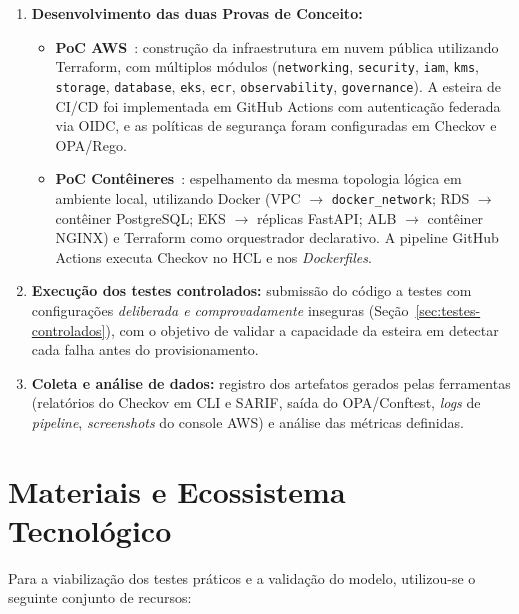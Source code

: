 \begin{enumerate}
    \item \textbf{Desenvolvimento das duas Provas de Conceito:}
    \begin{itemize}
        \item \textbf{PoC AWS}~: construção da infraestrutura em nuvem pública utilizando Terraform, com múltiplos módulos (\texttt{networking}, \texttt{security}, \texttt{iam}, \texttt{kms}, \texttt{storage}, \texttt{database}, \texttt{eks}, \texttt{ecr}, \texttt{observability}, \texttt{governance}). A esteira de CI/CD foi implementada em GitHub Actions com autenticação federada via OIDC, e as políticas de segurança foram configuradas em Checkov e OPA/Rego.
        \item \textbf{PoC Contêineres}~: espelhamento da mesma topologia lógica em ambiente local, utilizando Docker (VPC $\rightarrow$ \texttt{docker\_network}; RDS $\rightarrow$ contêiner PostgreSQL; EKS $\rightarrow$ réplicas FastAPI; ALB $\rightarrow$ contêiner NGINX) e Terraform como orquestrador declarativo. A pipeline GitHub Actions executa Checkov no HCL e nos \textit{Dockerfiles}.
    \end{itemize}

    \item \textbf{Execução dos testes controlados:} submissão do código a testes com configurações \textit{deliberada e comprovadamente} inseguras (Seção~\ref{sec:testes-controlados}), com o objetivo de validar a capacidade da esteira em detectar cada falha antes do provisionamento.

    \item \textbf{Coleta e análise de dados:} registro dos artefatos gerados pelas ferramentas (relatórios do Checkov em CLI e SARIF, saída do OPA/Conftest, \textit{logs} de \textit{pipeline}, \textit{screenshots} do console AWS) e análise das métricas definidas.
\end{enumerate}

\section{Materiais e Ecossistema Tecnológico}

Para a viabilização dos testes práticos e a validação do modelo, utilizou-se o seguinte conjunto de recursos:

